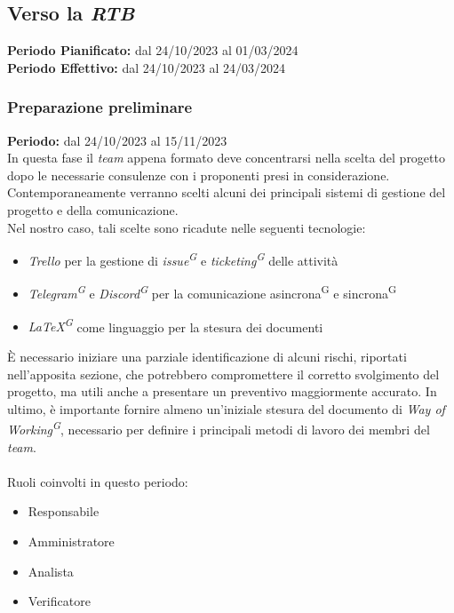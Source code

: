 \documentclass[5pt]{article}
\begin{document}
  \subsection{Verso la \textit{RTB}}
    \textbf{Periodo Pianificato:} dal 24/10/2023 al 01/03/2024\\
    \textbf{Periodo Effettivo:} dal 24/10/2023 al 24/03/2024
    \subsubsection{Preparazione preliminare}
      \textbf{Periodo:} dal 24/10/2023 al 15/11/2023 
      \vspace{0.3cm} \\
      In questa fase il \textit{team} appena formato deve concentrarsi nella scelta del progetto dopo le necessarie consulenze con i proponenti presi in considerazione. \\
      Contemporaneamente verranno scelti alcuni dei principali sistemi di gestione del progetto e della comunicazione. \\
      Nel nostro caso, tali scelte sono ricadute nelle seguenti tecnologie: 
      \begin{itemize}
        \item \textit{Trello} per la gestione di \textit{issue\textsuperscript{G}} e \textit{ticketing\textsuperscript{G}} delle attività
        \item \textit{Telegram\textsuperscript{G}} e \textit{Discord\textsuperscript{G}} per la comunicazione asincrona\textsuperscript{G} e sincrona\textsuperscript{G}
        \item \textit{\LaTeX\textsuperscript{G}} come linguaggio per la stesura dei documenti
      \end{itemize}
      È necessario iniziare una parziale identificazione di alcuni rischi, riportati nell'apposita sezione, che potrebbero compromettere il corretto svolgimento del progetto, 
      ma utili anche a presentare un preventivo maggiormente accurato. 
      In ultimo, è importante fornire almeno un'iniziale stesura del documento di \textit{Way of Working\textsuperscript{G}}, necessario per definire i principali metodi di lavoro dei membri del \textit{team}. \\\\
      Ruoli coinvolti in questo periodo:
      \begin{itemize}
          \item Responsabile
          \item Amministratore
          \item Analista
          \item Verificatore
      \end{itemize}
\end{document}
